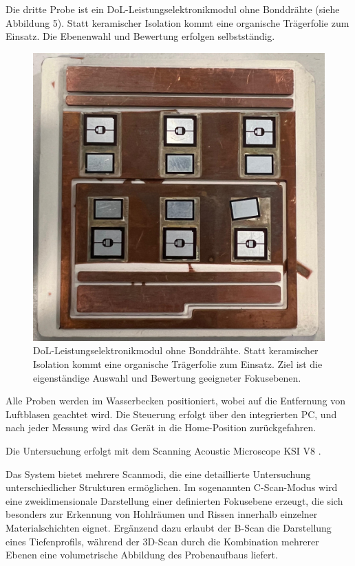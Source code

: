 Die dritte Probe ist ein DoL-Leistungselektronikmodul ohne Bonddrähte (siehe Abbildung 5). Statt keramischer Isolation kommt eine organische Trägerfolie zum Einsatz. Die Ebenenwahl und Bewertung erfolgen selbstständig.
\begin{figure}[H]
    \centering
    \includegraphics[scale=0.13]{Bilder/probe3}
    \caption{DoL-Leistungselektronikmodul ohne Bonddrähte. Statt keramischer Isolation kommt eine organische Trägerfolie zum Einsatz. Ziel ist die eigenständige Auswahl und Bewertung geeigneter Fokusebenen.}
    \vspace{0.2cm}
    \label{Abb.5: DoL-Leistungselektronikmodul ohne Bonddrähte. Statt keramischer Isolation kommt eine organische Trägerfolie zum Einsatz. Ziel ist die eigenständige Auswahl und Bewertung geeigneter Fokusebenen. }
\end{figure} 
\vspace{0.2cm}
Alle Proben werden im Wasserbecken positioniert, wobei auf die Entfernung von Luftblasen geachtet wird. Die Steuerung erfolgt über den integrierten PC, und nach jeder Messung wird das Gerät in die Home-Position zurückgefahren.



Die Untersuchung erfolgt mit dem Scanning Acoustic Microscope KSI V8 \cite{hennig2025}.

Das System bietet mehrere Scanmodi, die eine detaillierte Untersuchung unterschiedlicher Strukturen ermöglichen. Im sogenannten C-Scan-Modus wird eine zweidimensionale Darstellung einer definierten Fokusebene erzeugt, die sich besonders zur Erkennung von Hohlräumen und Rissen innerhalb einzelner Materialschichten eignet. Ergänzend dazu erlaubt der B-Scan die Darstellung eines Tiefenprofils, während der 3D-Scan durch die Kombination mehrerer Ebenen eine volumetrische Abbildung des Probenaufbaus liefert.




